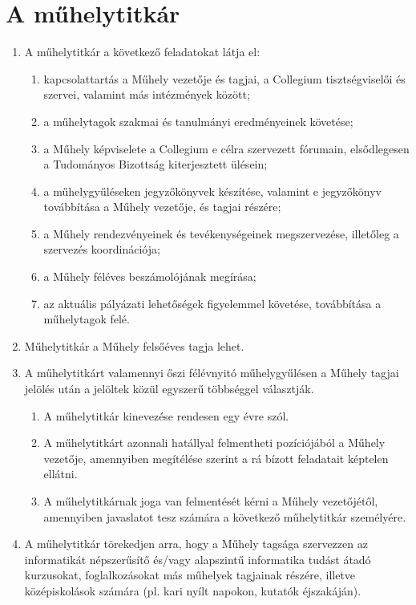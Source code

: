 \documentclass{../styles/rulebook}
\begin{document}
\section{A műhelytitkár}
\begin{enumerate}
	\item A műhelytitkár a következő feladatokat látja el:
	\begin{enumerate}
		\item kapcsolattartás a Műhely vezetője és tagjai, a Collegium tisztségviselői és szervei, valamint más intézmények között;
		\item a műhelytagok szakmai és tanulmányi eredményeinek követése;
		\item a Műhely képviselete a Collegium e célra szervezett fórumain, elsődlegesen a Tudományos Bizottság kiterjesztett ülésein;
		\item a műhelygyűléseken jegyzőkönyvek készítése, valamint e jegyzőkönyv továbbítása a Műhely vezetője, és tagjai részére;
		\item a Műhely rendezvényeinek és tevékenységeinek megszervezése, illetőleg a szervezés koordinációja;
		\item a Műhely féléves beszámolójának megírása;
		\item az aktuális pályázati lehetőségek figyelemmel követése, továbbítása a műhelytagok felé.
	\end{enumerate}
	\item Műhelytitkár a Műhely felsőéves tagja lehet.
	\item A műhelytitkárt valamennyi őszi félévnyitó műhelygyűlésen a Műhely tagjai jelölés után a jelöltek közül egyszerű többséggel választják.
	\begin{enumerate}
	    \item  A műhelytitkár kinevezése rendesen egy évre szól.
		\item A műhelytitkárt azonnali hatállyal felmentheti pozíciójából a Műhely vezetője, amennyiben megítélése szerint a rá bízott feladatait képtelen ellátni.
		\item A műhelytitkárnak joga van felmentését kérni a Műhely vezetőjétől, amennyiben javaslatot tesz számára a következő műhelytitkár személyére.
	\end{enumerate}
	\item A műhelytitkár törekedjen arra, hogy a Műhely tagsága szervezzen az informatikát népszerűsítő és/vagy alapszintű informatika tudást átadó kurzusokat, foglalkozásokat más műhelyek tagjainak részére, illetve középiskolások számára (pl. kari nyílt napokon, kutatók éjszakáján).
\end{enumerate}
\end{document}

